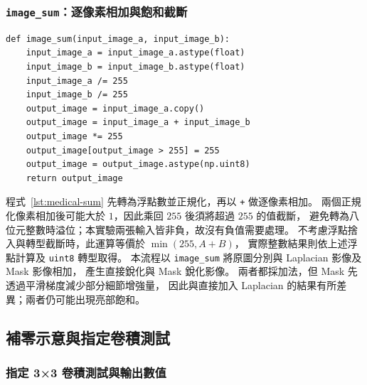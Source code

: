 \subsubsection{\textnormal{\texttt{image\_sum}}：逐像素相加與飽和截斷}

\noindent\begin{minipage}{\linewidth}
\begin{lstlisting}[caption={將細節影像加回原圖並限制最大灰階},label={lst:medical-sum}]
def image_sum(input_image_a, input_image_b):
    input_image_a = input_image_a.astype(float)
    input_image_b = input_image_b.astype(float)
    input_image_a /= 255
    input_image_b /= 255
    output_image = input_image_a.copy()
    output_image = input_image_a + input_image_b
    output_image *= 255
    output_image[output_image > 255] = 255
    output_image = output_image.astype(np.uint8)
    return output_image
\end{lstlisting}
\end{minipage}\par

程式~\ref{lst:medical-sum} 先轉為浮點數並正規化，再以 \texttt{+} 做逐像素相加。
兩個正規化像素相加後可能大於 $1$，因此乘回 $255$ 後須將超過 $255$ 的值截斷，
避免轉為八位元整數時溢位；本實驗兩張輸入皆非負，故沒有負值需要處理。
不考慮浮點捨入與轉型截斷時，此運算等價於 $\min(255,A+B)$，
實際整數結果則依上述浮點計算及 \texttt{uint8} 轉型取得。
本流程以 \texttt{image\_sum} 將原圖分別與 Laplacian 影像及 Mask 影像相加，
產生直接銳化與 Mask 銳化影像。
兩者都採加法，但 Mask 先透過平滑梯度減少部分細節增強量，
因此與直接加入 Laplacian 的結果有所差異；兩者仍可能出現亮部飽和。

\subsection{補零示意與指定卷積測試}
\label{sec:medical-convolution-test}

\subsubsection{指定 3×3 卷積測試與輸出數值}

